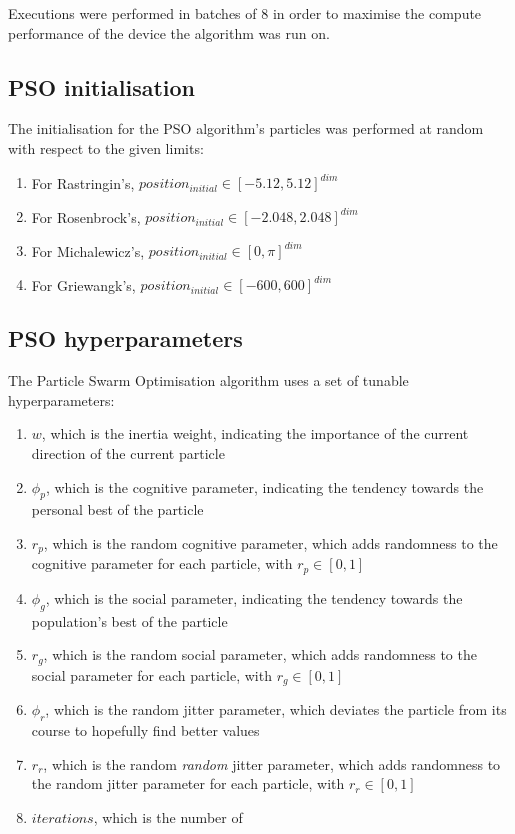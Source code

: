 \documentclass[conference]{IEEEtran}
\begin{document}
Executions were performed in batches of 8 in order to maximise the compute performance of the device the algorithm was run on.

\subsection{PSO initialisation}
The initialisation for the PSO algorithm's particles was performed at random with respect to the given limits:

\begin{enumerate}
    \item For Rastringin's, $position_{initial} \in [-5.12, 5.12]^{dim}$
    \item For Rosenbrock's, $position_{initial} \in [-2.048, 2.048]^{dim}$
    \item For Michalewicz's, $position_{initial} \in [0, \pi]^{dim}$
    \item For Griewangk's, $position_{initial} \in [-600, 600]^{dim}$
\end{enumerate}

\subsection{PSO hyperparameters}
The Particle Swarm Optimisation algorithm uses a set of tunable hyperparameters:

\begin{enumerate}
    \item $w$, which is the inertia weight, indicating the importance of the current direction of the current particle 
    \item $\phi_p$, which is the cognitive parameter, indicating the tendency towards the personal best of the particle
    \item $r_p$, which is the random cognitive parameter, which adds randomness to the cognitive parameter for each particle, with $r_p \in [0, 1]$
    \item $\phi_g$, which is the social parameter, indicating the tendency towards the population's best of the particle
    \item $r_g$, which is the random social parameter, which adds randomness to the social parameter for each particle, with $r_g \in [0, 1]$ 
    \item $\phi_r$, which is the random jitter parameter, which deviates the particle from its course to hopefully find better values
    \item $r_r$, which is the random \textit{random} jitter parameter, which adds randomness to the random jitter parameter for each particle, with $r_r \in [0, 1]$
    \item $iterations$, which is the number of 
\end{enumerate}
\end{document}
